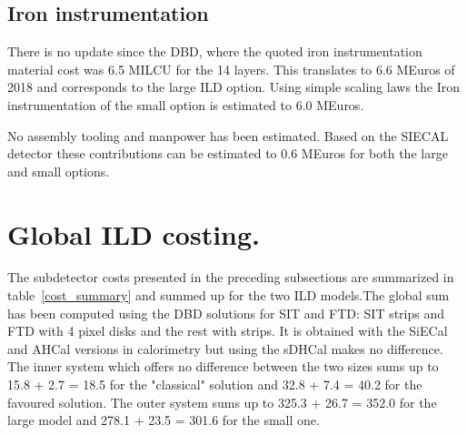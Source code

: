 \subsection{Iron instrumentation}
There is no update since the DBD, where the quoted iron instrumentation material cost was 6.5 MILCU for the 14 layers. This translates to 6.6 MEuros of 2018 and corresponds to the large ILD option. Using simple scaling laws the Iron instrumentation of the small option is estimated to 6.0 MEuros.


No assembly tooling and manpower has been estimated. Based on the SIECAL detector these contributions can be estimated to 0.6 MEuros for both the large and small options. 

\section{Global ILD costing.}
The subdetector costs presented in the preceding subsections are summarized in table~\ref{cost_summary} and summed up for the two ILD models.The global sum has been computed using the DBD solutions for SIT and FTD: SIT strips and FTD with 4 pixel disks and the rest with strips. It is obtained with the SiECal and AHCal versions in calorimetry but using the sDHCal makes no difference.
The inner system which offers no difference between the two sizes sums up to 15.8 + 2.7 = 18.5 for the "classical" solution and 32.8 + 7.4 = 40.2 for the favoured solution. The outer system sums up to 325.3 + 26.7 = 352.0 for the large model and 278.1 + 23.5 = 301.6  for the small one.
